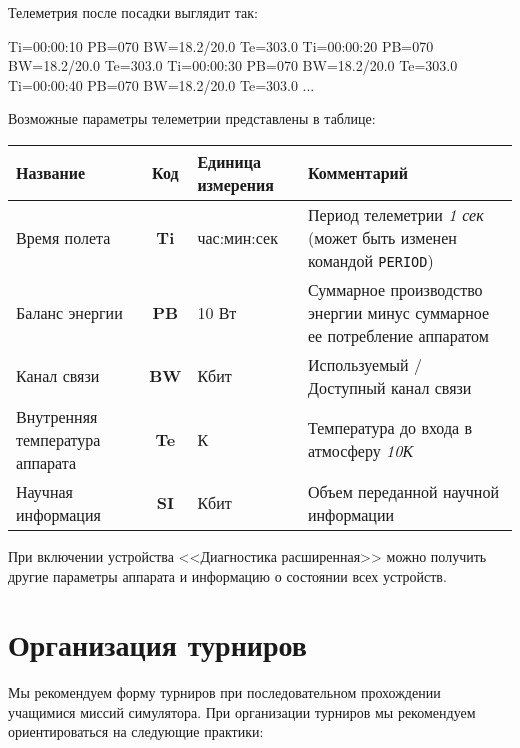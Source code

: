 \documentclass[12pt,a4paper]{article}
\begin{document}
Телеметрия после посадки выглядит так:

\begin{verbatim*}
Ti=00:00:10 PB=070 BW=18.2/20.0 Te=303.0
Ti=00:00:20 PB=070 BW=18.2/20.0 Te=303.0
Ti=00:00:30 PB=070 BW=18.2/20.0 Te=303.0
Ti=00:00:40 PB=070 BW=18.2/20.0 Te=303.0
...
\end{verbatim*}

Возможные параметры телеметрии представлены в таблице:

\begin{center}
\begin{tabular}{ |p{4cm}|c|p{2.5cm}|p{6cm}| } 
  \hline
  \textbf{Название} & \textbf{Код} & \textbf{Единица измерения} & \textbf{Комментарий} \\
  \hline
  Время полета & \textbf{Ti} & час:мин:сек & Период телеметрии \emph{1 сек} (может быть
  изменен командой \verb'PERIOD')\\
  \hline
  Баланс энергии & \textbf{PB} & 10 Вт & Суммарное производство энергии минус суммарное ее
  потребление аппаратом\\
  \hline
  Канал связи & \textbf{BW} & Кбит & Используемый / Доступный канал связи\\
  \hline
  Внутренняя температура аппарата & \textbf{Te} & К & Температура до входа в атмосферу \emph{10К}\\
  \hline
  Научная информация & \textbf{SI} & Кбит & Объем переданной научной информации\\
  \hline
\end{tabular}
\end{center}

При включении устройства <<Диагностика расширенная>> можно получить другие параметры
аппарата и информацию о состоянии всех устройств.

\section{Организация турниров}

Мы рекомендуем форму турниров при последовательном прохождении учащимися миссий
симулятора. При организации турниров мы рекомендуем ориентироваться на следующие практики:
\end{document}
